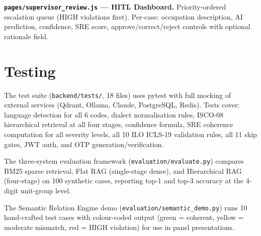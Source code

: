 \textbf{\texttt{pages/\-supervisor\_\-review.\-js} --- HITL Dashboard.}
Priority-ordered escalation queue (HIGH violations first).
Per-case: occupation description, AI prediction, confidence, SRE score,
approve/correct/reject controls with optional rationale field.

\section{Testing}
\label{sec:impl-testing}

The test suite (\texttt{backend/tests/}, 18 files) uses pytest with full mocking
of external services (Qdrant, Ollama, Claude, PostgreSQL, Redis).
Tests cover: language detection for all 6 codes, dialect normalisation rules,
ISCO-08 hierarchical retrieval at all four stages, confidence formula, SRE
coherence computation for all severity levels, all 10 ILO ICLS-19 validation
rules, all 11 skip gates, JWT auth, and OTP generation/verification.

The three-system evaluation framework (\texttt{evaluation/evaluate.py})
compares BM25 sparse retrieval, Flat RAG (single-stage dense), and Hierarchical
RAG (four-stage) on 100 synthetic cases, reporting top-1 and top-3 accuracy
at the 4-digit unit-group level.

The Semantic Relation Engine demo (\texttt{evaluation/\-semantic\_\-demo.\-py})
runs 10 hand-crafted test cases with colour-coded output (green = coherent,
yellow = moderate mismatch, red = HIGH violation) for use in panel presentations.
